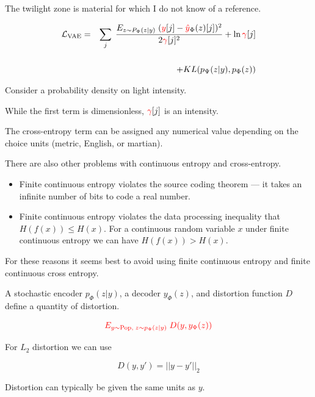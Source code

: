 {\vfill
The twilight zone is material for which I do not know of a reference. 


\bigskip
\begin{eqnarray*}
{\cal L}_{\mathrm{VAE}} & = & \sum_j\;\frac{E_{z \sim P_\Psi(z|y)}\;
({\color{red}y}[j] - {\color{red} \hat{y}}_\Phi(z)[j])^2}{2{\color{red} \gamma}[j]^2}
+ \ln {\color{red} \gamma}[j] \\
\\
& & + KL(p_\Psi(z|y),p_\Phi(z))
\end{eqnarray*}

\vfill Consider a probability density on light intensity.

\vfill
While the first term is dimensionless, ${\color{red} \gamma}[j]$ is an intensity.

\vfill
{\color{red} The cross-entropy term can be assigned any numerical value depending on the choice units (metric, English, or martian).}


There are also other problems with continuous entropy and cross-entropy.

\vfill
\begin{itemize}
\item Finite continuous entropy violates the source coding theorem --- it takes an infinite number of bits to code a real number.

\vfill
\item Finite continuous entropy violates the data processing inequality that $H(f(x)) \leq H(x)$.  For a continuous random variable $x$ under finite continuous entropy we can have $H(f(x)) > H(x)$.
\end{itemize}

\vfill
For these reasons it seems best to avoid using finite continuous entropy and finite continuous cross entropy.


A stochastic encoder $p_\Phi(z|y)$, a decoder $y_\Phi(z)$, and distortion function $D$ define a quantity of distortion.

$${\color{red} E_{y \sim \mathrm{Pop},\;z \sim p_\Phi(z|y)}\;D(y,y_\Phi(z))}$$

\vfill
For $L_2$ distortion we can use

$$D(y,y') = ||y - y'||_2$$

\vfill
Distortion can typically be given the same units as $y$.

}
